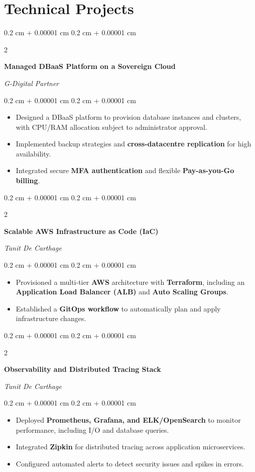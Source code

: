 \documentclass[9pt, letterpaper]{article}
\newenvironment{highlights}{
    \begin{itemize}[
        topsep=0.03 cm,
        parsep=0.03 cm,
        partopsep=0pt,
        itemsep=0pt,
        leftmargin=0.4 cm + 10pt
    ]
}{
    \end{itemize}
}
\newenvironment{onecolentry}{
    \begin{adjustwidth}{
        0.2 cm + 0.00001 cm
    }{
        0.2 cm + 0.00001 cm
    }
}{
    \end{adjustwidth}
}
\newenvironment{twocolentry}[2][]{
    \onecolentry
    \def\secondColumn{#2}
    \setcolumnwidth{\fill, 4.5 cm}
    \begin{paracol}{2}
}{
    \switchcolumn \raggedleft \secondColumn
    \end{paracol}
    \endonecolentry
}
\begin{document}
\section{Technical Projects}
\begin{twocolentry}{\textit{G-Digital Partner}}
\textbf{Managed DBaaS Platform on a Sovereign Cloud}
\end{twocolentry}
\begin{onecolentry}
\begin{highlights}
\item Designed a DBaaS platform to provision database instances and clusters, with CPU/RAM allocation subject to administrator approval.
\item Implemented backup strategies and \textbf{cross-datacentre replication} for high availability.
\item Integrated secure \textbf{MFA authentication} and flexible \textbf{Pay-as-you-Go billing}.
\end{highlights}
\end{onecolentry}

\begin{twocolentry}{\textit{Tanit De Carthage}}
\textbf{Scalable AWS Infrastructure as Code (IaC)}
\end{twocolentry}
\begin{onecolentry}
\begin{highlights}
\item Provisioned a multi-tier \textbf{AWS} architecture with \textbf{Terraform}, including an \textbf{Application Load Balancer (ALB)} and \textbf{Auto Scaling Groups}.
\item Established a \textbf{GitOps workflow} to automatically plan and apply infrastructure changes.
\end{highlights}
\end{onecolentry}

\begin{twocolentry}{\textit{Tanit De Carthage}}
\textbf{Observability and Distributed Tracing Stack}
\end{twocolentry}
\begin{onecolentry}
\begin{highlights}
\item Deployed \textbf{Prometheus, Grafana, and ELK/OpenSearch} to monitor performance, including I/O and database queries.
\item Integrated \textbf{Zipkin} for distributed tracing across application microservices.
\item Configured automated alerts to detect security issues and spikes in errors.
\end{highlights}
\end{onecolentry}
\end{document}
